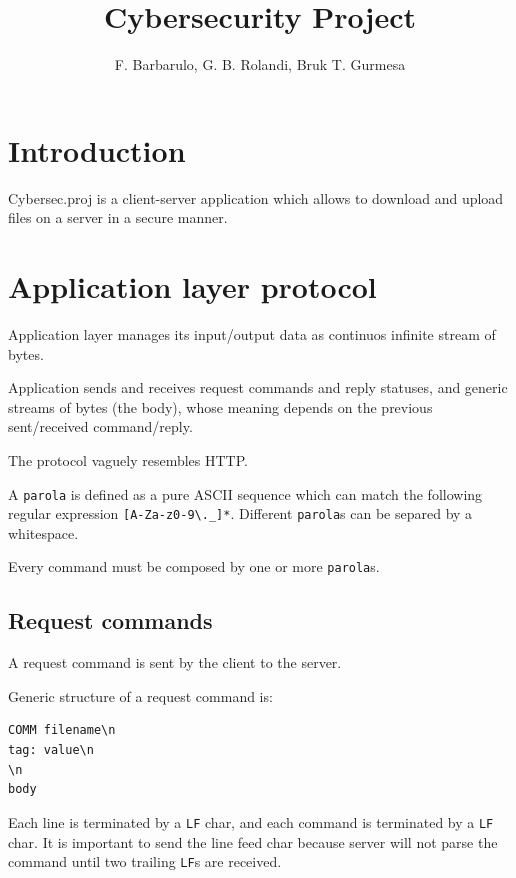 \documentclass[a4paper,12pt]{article}
\title{Cybersecurity Project}
\author{F. Barbarulo, G. B. Rolandi, Bruk T. Gurmesa}
\newcommand{\projectname}{Cybersec.proj}
\begin{document}
\maketitle
\tableofcontents

\clearpage

\section{Introduction}
\projectname{} is a client-server application which allows to download and upload files on a server in a secure manner.

\section{Application layer protocol}
Application layer manages its input/output data as continuos infinite stream of bytes.

Application sends and receives request commands and reply statuses, and generic streams of bytes (the body), whose meaning depends on the previous sent/received command/reply.

The protocol vaguely resembles HTTP.

A \texttt{parola} is defined as a pure ASCII sequence which can match the following regular expression \texttt{[A-Za-z0-9\textbackslash.\_]*}.
Different \texttt{parola}s can be separed by a whitespace.

Every command must be composed by one or more \texttt{parola}s.

\subsection{Request commands}
A request command is sent by the client to the server.

Generic structure of a request command is:
\begin{verbatim}
COMM filename\n
tag: value\n
\n
body
\end{verbatim}

Each line is terminated by a \texttt{LF} char, and each command is terminated by a \texttt{LF} char.
It is important to send the line feed char because server will not parse the command until two trailing \texttt{LF}s are received.
\end{document}

